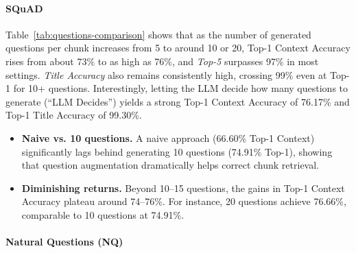 


\paragraph{SQuAD}
Table~\ref{tab:questions-comparison} shows that as the number of generated questions per chunk increases from 5 
to around 10 or 20, Top-1 Context Accuracy rises from about 73\% to as high as 76\%, and \emph{Top-5} surpasses 97\% in most settings. 
\emph{Title Accuracy} also remains consistently high, crossing 99\% even at Top-1 for 10+ questions. 
Interestingly, letting the LLM decide how many questions to generate (``LLM Decides'') yields a strong Top-1 Context Accuracy of 76.17\% 
and Top-1 Title Accuracy of 99.30\%.

\begin{itemize}
    \item \textbf{Naive vs. 10 questions.} A naive approach (66.60\% Top-1 Context) significantly lags behind 
    generating 10 questions (74.91\% Top-1), showing that question augmentation dramatically helps correct chunk retrieval.
    \item \textbf{Diminishing returns.} Beyond 10–15 questions, the gains in Top-1 Context Accuracy plateau 
    around 74–76\%. For instance, 20 questions achieve 76.66\%, comparable to 10 questions at 74.91\%.
\end{itemize}



\paragraph{Natural Questions (NQ)}

